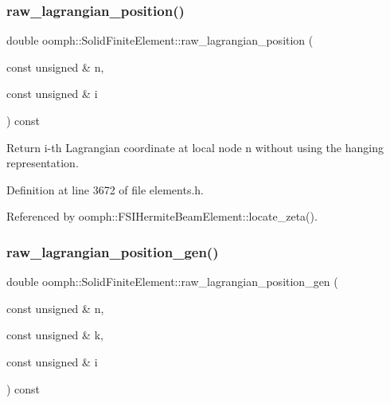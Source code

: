 \mbox{\label{classoomph_1_1SolidFiniteElement_a41a77b7103970bbc6ca0aecaf81747b1}} 
\subsubsection{\texorpdfstring{raw\+\_\+lagrangian\+\_\+position()}{raw\_lagrangian\_position()}}
{\footnotesize\ttfamily double oomph\+::\+Solid\+Finite\+Element\+::raw\+\_\+lagrangian\+\_\+position (\begin{DoxyParamCaption}\item[{const unsigned \&}]{n,  }\item[{const unsigned \&}]{i }\end{DoxyParamCaption}) const\hspace{0.3cm}{\ttfamily [inline]}}



Return i-\/th Lagrangian coordinate at local node n without using the hanging representation. 



Definition at line 3672 of file elements.\+h.



Referenced by oomph\+::\+F\+S\+I\+Hermite\+Beam\+Element\+::locate\+\_\+zeta().

\mbox{\label{classoomph_1_1SolidFiniteElement_a1fe7adc8a71165fb86404d6028d19ae1}} 
\subsubsection{\texorpdfstring{raw\+\_\+lagrangian\+\_\+position\+\_\+gen()}{raw\_lagrangian\_position\_gen()}}
{\footnotesize\ttfamily double oomph\+::\+Solid\+Finite\+Element\+::raw\+\_\+lagrangian\+\_\+position\+\_\+gen (\begin{DoxyParamCaption}\item[{const unsigned \&}]{n,  }\item[{const unsigned \&}]{k,  }\item[{const unsigned \&}]{i }\end{DoxyParamCaption}) const\hspace{0.3cm}{\ttfamily [inline]}}



